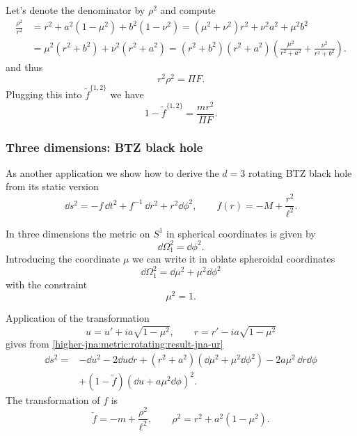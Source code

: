 Let's denote the denominator by $\rho^2$ and compute
\begin{align*}
	\frac{\rho^2}{r^2} &= r^2 + a^2 (1 - \mu^2) + b^2 (1 - \nu^2)
		= (\mu^2 + \nu^2) r^2 + \nu^2 a^2 + \mu^2 b^2 \\
		&= \mu^2 (r^2 + b^2) + \nu^2 (r^2 + a^2)
		= (r^2 + b^2) (r^2 + a^2) \left( \frac{\mu^2}{r^2 + a^2} + \frac{\nu^2}{r^2 + b^2} \right).
\end{align*}
and thus
\begin{equation}
	r^2 \rho^2 = \Pi F.
\end{equation} 
Plugging this into $\tilde f^{\{1, 2\}}$ we have~\cite{Myers:1986:BlackHolesHigher}
\begin{equation}
	1 - \tilde f^{\{1, 2\}} = \frac{m r^2}{\Pi F}.
\end{equation} 


\subsubsection{Three dimensions: BTZ black hole}
\label{sec:higher-jna:examples:btz}


As another application we show how to derive the $d = 3$ rotating BTZ black hole from its static version~\cite{Banados:1992:BlackHoleThree}
\begin{equation}
	\dd s^2 = - f\, \dd t^2 + f^{-1}\, \dd r^2 + r^2 \dd\phi^2, \qquad
	f(r) = - M + \frac{r^2}{\ell^2}.
\end{equation} 

In three dimensions the metric on $S^1$ in spherical coordinates is given by
\begin{equation}
	\dd\Omega_1^2 = \dd\phi^2.
\end{equation} 
Introducing the coordinate $\mu$ we can write it in oblate spheroidal coordinates
\begin{equation}
	\dd\Omega_1^2 = \dd\mu^2 + \mu^2 \dd\phi^2
\end{equation} 
with the constraint
\begin{equation}
	\mu^2 = 1.
\end{equation} 

Application of the transformation
\begin{equation}
	u = u' + i a \sqrt{1 - \mu^2}, \qquad
	r = r' - i a \sqrt{1 - \mu^2}
\end{equation} 
gives from \eqref{higher-jna:metric:rotating:result-jna-ur}
\begin{equation}
	\begin{aligned}
		\dd s^2 = &- \dd u^2 - 2 \dd u \dd r
			+ (r^2 + a^2) (\dd \mu^2 + \mu^2 \dd \phi^2)
			- 2 a \mu^2 \, \dd r \dd \phi \\
			&+ (1 - \tilde f) (\dd u + a \mu^2 \dd \phi )^2.
	\end{aligned}
\end{equation} 
The transformation of $f$ is
\begin{equation}
	\tilde f = - m + \frac{\rho^2}{\ell^2}, \qquad
	\rho^2 = r^2 + a^2 (1 - \mu^2).
\end{equation} 

